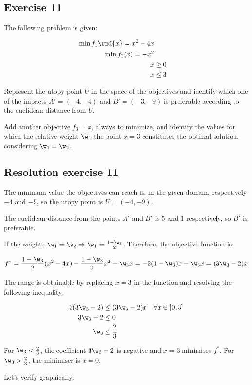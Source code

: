 \documentclass[\main/main.tex]{subfiles}
\begin{document}
\subsection{Exercise 11}
The following problem is given:

\begin{align*}
  \min f_1\rnd{x} = x^2 - 4x \\
  \min f_2(x) = -x^2         \\
  x & \geq 0                 \\
  x & \leq 3                 \\
\end{align*}


Represent the utopy point $U$ in the space of the objectives and identify which one of the impacts $A' = (-4, -4)$ and $B' = (-3, -9)$ is preferable according to the euclidean distance from $U$.

Add another objective $f_3 = x$, always to minimize, and identify the values for which the relative weight $\w_3$ the point $x = 3$ constitutes the optimal solution, considering $\w_1 = \w_2$.

\subsection{Resolution exercise 11}
The minimum value the objectives can reach is, in the given domain, respectively $-4$ and $-9$, so the utopy point is $U = (-4, -9)$.

The euclidean distance from the points $A'$ and $B'$ is $5$ and $1$ respectively, so $B'$ is preferable.

If the weights $\w_1 = \w_2 \Rightarrow \w_1 = \frac{1 - \w_3}{2}$. Therefore, the objective function is:

\[
  f^* = \frac{1 - \w_3}{2}(x^2-4x) - \frac{1 - \w_3}{2}x^2 + \w_3 x = -2(1 - \w_3)x + \w_3x = (3\w_3-2)x
\]

The range is obtainable by replacing $x=3$ in the function and resolving the following inequality:

\begin{align*}
  3(3\w_3-2) & \leq (3\w_3-2)x \quad \forall x \in [0,3] \\
  3\w_3-2    & \leq 0                                     \\
  \w_3       & \leq \frac{2}{3}
\end{align*}

For $\w_3 < \frac{2}{3}$, the coefficient $3\w_3-2$ is negative and $x=3$ minimises $f^*$. For $\w_3 > \frac{2}{3}$, the minimiser is $x=0$.

Let's verify graphically:

\begin{figure}

\end{figure}
\end{document}
